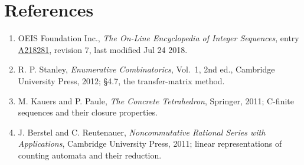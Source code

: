 \documentclass[11pt]{article}
\theoremstyle{definition}
\begin{document}
\section{References}

\begin{enumerate}

\item OEIS Foundation Inc., \emph{The On-Line Encyclopedia of Integer Sequences}, entry \href{https://oeis.org/A218281}{A218281}, revision 7, last modified Jul 24 2018.

\item R. P. Stanley, \emph{Enumerative Combinatorics}, Vol.~1, 2nd ed., Cambridge University Press, 2012; \S4.7, the transfer-matrix method.

\item M. Kauers and P. Paule, \emph{The Concrete Tetrahedron}, Springer, 2011; C-finite sequences and their closure properties.

\item J. Berstel and C. Reutenauer, \emph{Noncommutative Rational Series with Applications}, Cambridge University Press, 2011; linear representations of counting automata and their reduction.

\end{enumerate}
\end{document}
